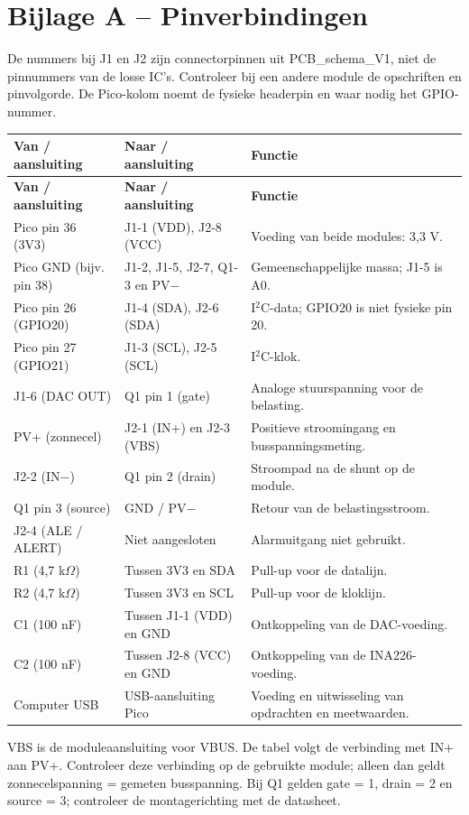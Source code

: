 \documentclass[a4paper,10pt]{article}
\begin{document}
\section*{Bijlage A -- Pinverbindingen}
De nummers bij J1 en J2 zijn connectorpinnen uit PCB\_schema\_V1, niet de pinnummers van de losse IC's. Controleer bij een andere module de opschriften en pinvolgorde. De Pico-kolom noemt de fysieke headerpin en waar nodig het GPIO-nummer.

{\small
\begin{longtable}{@{}P{4.7cm}P{5.1cm}P{6cm}@{}}
\toprule
\textbf{Van / aansluiting} & \textbf{Naar / aansluiting} & \textbf{Functie} \\
\midrule
\endfirsthead
\toprule
\textbf{Van / aansluiting} & \textbf{Naar / aansluiting} & \textbf{Functie} \\
\midrule
\endhead
Pico pin 36 (3V3) & J1-1 (VDD), J2-8 (VCC) & Voeding van beide modules: 3,3 V. \\
Pico GND (bijv. pin 38) & J1-2, J1-5, J2-7, Q1-3 en PV$-$ & Gemeenschappelijke massa; J1-5 is A0. \\
Pico pin 26 (GPIO20) & J1-4 (SDA), J2-6 (SDA) & I$^2$C-data; GPIO20 is niet fysieke pin 20. \\
Pico pin 27 (GPIO21) & J1-3 (SCL), J2-5 (SCL) & I$^2$C-klok. \\
J1-6 (DAC OUT) & Q1 pin 1 (gate) & Analoge stuurspanning voor de belasting. \\
PV+ (zonnecel) & J2-1 (IN+) en J2-3 (VBS) & Positieve stroomingang en busspanningsmeting. \\
J2-2 (IN$-$) & Q1 pin 2 (drain) & Stroompad na de shunt op de module. \\
Q1 pin 3 (source) & GND / PV$-$ & Retour van de belastingsstroom. \\
J2-4 (ALE / ALERT) & Niet aangesloten & Alarmuitgang niet gebruikt. \\
R1 (4,7 k$\Omega$) & Tussen 3V3 en SDA & Pull-up voor de datalijn. \\
R2 (4,7 k$\Omega$) & Tussen 3V3 en SCL & Pull-up voor de kloklijn. \\
C1 (100 nF) & Tussen J1-1 (VDD) en GND & Ontkoppeling van de DAC-voeding. \\
C2 (100 nF) & Tussen J2-8 (VCC) en GND & Ontkoppeling van de INA226-voeding. \\
Computer USB & USB-aansluiting Pico & Voeding en uitwisseling van opdrachten en meetwaarden. \\
\bottomrule
\end{longtable}
}
VBS is de moduleaansluiting voor VBUS. De tabel volgt de verbinding met IN+ aan PV+. Controleer deze verbinding op de gebruikte module; alleen dan geldt zonnecelspanning = gemeten busspanning. Bij Q1 gelden gate = 1, drain = 2 en source = 3; controleer de montagerichting met de datasheet.
\clearpage
\end{document}
